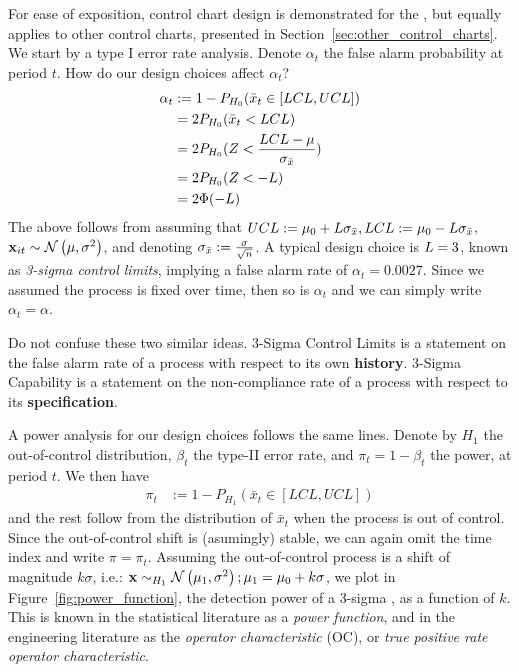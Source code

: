 For ease of exposition, control chart design is demonstrated for the \barxChart, but equally applies to other control charts, presented in Section~\ref{sec:other_control_charts}.
We start by a type I error rate analysis. 
Denote $\alpha_t$ the false alarm probability at period $t$.
How do our design choices affect $\alpha_t$?
\begin{align}
	\alpha_t &:= 1-P_{H_0}(\bar{x}_t \in [LCL,UCL]) \\
	&= 2 P_{H_0}(\bar{x}_t<LCL) \\
	&= 2 P_{H_0}(Z<\frac{LCL-\mu}{\sigma_{\bar{x}}}) \\
	&= 2 P_{H_0}(Z < -L) \\
	&= 2 \Phi(-L)
\end{align}
The above follows from assuming that $UCL:=\mu_0 + L \sigma_{\bar{x}}, LCL:= \mu_0 - L \sigma_{\bar{x}}$, $\mathbf{x}_{it}\sim \mathcal{N}\left(\mu,\sigma^2\right)$, and denoting $\sigma_{\bar{x}}:= \frac{\sigma}{\sqrt{n}}$.
A typical design choice is $L=3$, known as \emph{3-sigma control limits}, implying a false alarm rate of $\alpha_t=0.0027$.
Since we assumed the process is fixed over time, then so is $\alpha_t$ and we can simply write $\alpha_t=\alpha$.

\begin{remark}
Do not confuse these two similar ideas.
3-Sigma Control Limits is a statement on the false alarm rate of a process with respect to its own \textbf{history}.
3-Sigma Capability is a statement on the non-compliance rate of a process with respect to its \textbf{specification}.
\end{remark}


A power analysis for our design choices follows the same lines.
Denote by $H_1$ the out-of-control distribution,  $\beta_t$ the type-II error rate, and $\pi_t=1-\beta_t$ the power, at period $t$.
We then have
\begin{align}
	\pi_t &:= 1-P_{H_1}(\bar{x}_t \in [LCL,UCL])
\end{align}
and the rest follow from the distribution of $\bar{x}_t$ when the process is out of control.
Since the out-of-control shift is (asumingly) stable, we can again omit the time index and write $\pi=\pi_t$.
Assuming the out-of-control process is a shift of magnitude $k \sigma$, i.e.: $\mathbf{x} \sim_{H_1} \mathcal{N}\left(\mu_1,\sigma^2\right); \mu_1=\mu_0+ k \sigma$, we plot in Figure~\ref{fig:power_function}, the detection power of a 3-sigma \barxChart, as a function of $k$. 
This is known in the statistical literature as a \emph{power function}, and in the engineering literature as the \emph{operator characteristic} (OC), or \emph{true positive rate operator characteristic}.


